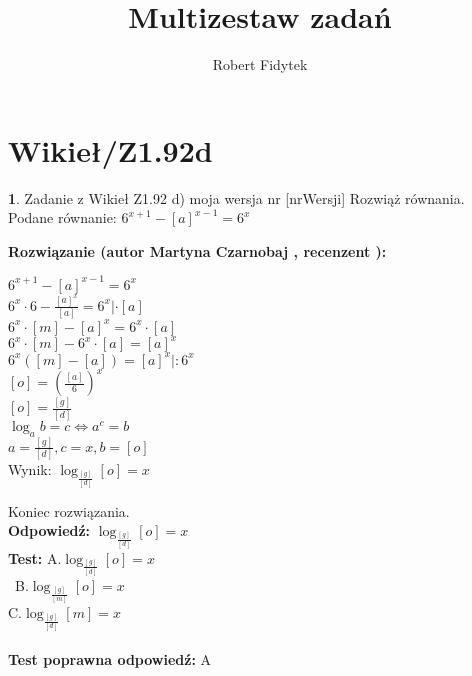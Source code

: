 \documentclass[12pt, a4paper]{article}
\title{Multizestaw zadań}
\author{Robert Fidytek}
\date{}
\theoremstyle{definition} %
\newtheorem{zad}{}
\newcommand{\kategoria}[1]{\section{#1}} %
\newcommand{\zadStart}[1]{\begin{zad}#1\newline} %
\newcommand{\zadStop}{\end{zad}}   %
\newcommand{\rozwStart}[2]{\noindent \textbf{Rozwiązanie (autor #1 , recenzent #2): }\newline} %
\newcommand{\rozwStop}{\newline}                                            %
\newcommand{\odpStart}{\noindent \textbf{Odpowiedź:}\newline}    %
\newcommand{\odpStop}{\newline}                                             %
\newcommand{\testStart}{\noindent \textbf{Test:}\newline} %
\newcommand{\testStop}{\newline} %
\newcommand{\kluczStart}{\noindent \textbf{Test poprawna odpowiedź:}\newline} %
\newcommand{\kluczStop}{\newline} %
\begin{document}
\maketitle

\kategoria{Wikieł/Z1.92d}
\zadStart{Zadanie z Wikieł Z1.92 d) moja wersja nr [nrWersji]}
Rozwiąż równania.\\
Podane równanie: $ 6^{x + 1} - [a]^{x - 1} = 6^{x} $\\
\zadStop
\rozwStart{Martyna Czarnobaj}{}
\begin{center}
	$ 6^{x + 1} - [a]^{x - 1} = 6^{x} $\\
	$ 6^{x} \cdot 6 - \frac{[a]^{x}}{[a]} = 6^{x} | \cdot [a] $\\
	$ 6^{x} \cdot [m] - [a]^{x} = 6^{x} \cdot [a] $\\
	$ 6^{x} \cdot [m] - 6^{x} \cdot [a] = [a]^{x} $\\
	$ 6^{x}([m]-[a]) = [a]^{x} |:6^{x} $\\
	$ [o]=(\frac{[a]}{6})^{x} $\\
	$ [o]=\frac{[g]}{[d]}$\\
	$ \log_{a} b = c \Leftrightarrow a^{c} = b $\\
	$ a = \frac{[g]}{[d]}, c = x, b = [o] $\\
	Wynik: $ \log_{\frac{[g]}{[d]}} [o] = x $\\
\end{center}
Koniec rozwiązania.\\
\rozwStop
\odpStart
 $ \log_{\frac{[g]}{[d]}} [o] = x $\\
\odpStop
\testStart
A.$ \log_{\frac{[g]}{[d]}} [o] = x $\\\
B.$ \log_{\frac{[g]}{[m]}} [o] = x $\\
C.$ \log_{\frac{[g]}{[d]}} [m] = x $\\\\
\testStop
\kluczStart
A
\kluczStop
\end{document}
